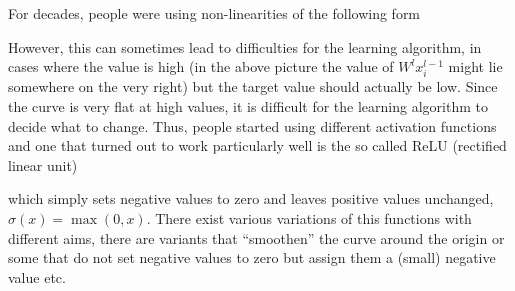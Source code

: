 For decades, people were using non-linearities of the following form
\begin{figure}[H]
  \centering
\end{figure}

However, this can sometimes lead to difficulties for the learning algorithm, \eg
in cases where the value is high (\ie in the above picture the value of
$W^l x^{l-1}_i$ might lie somewhere on the very right) but the target value
should actually be low. Since the curve is very flat at high values, it is
difficult for the learning algorithm to decide what to change. Thus, people
started using different activation functions and one that turned out to work
particularly well is the so called ReLU (rectified linear unit)
\begin{figure}[H]
  \centering
\end{figure}
which simply sets negative values to zero and leaves positive values unchanged,
\ie $\sigma(x) = \max(0,x)$. There exist various variations of this functions
with different aims, \eg there are variants that ``smoothen'' the curve around
the origin or some that do not set negative values to zero but assign them a
(small) negative value etc.

